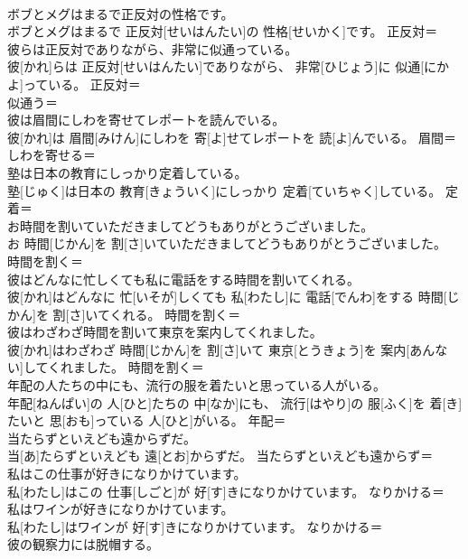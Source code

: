 \documentclass[8pt]{extreport}
\begin{document}
\begin{CJK}{UTF8}{min}
\\	ボブとメグはまるで正反対の性格です。	
\\	ボブとメグはまるで 正反対[せいはんたい]の 性格[せいかく]です。	正反対＝ 
\\	彼らは正反対でありながら、非常に似通っている。	
\\	彼[かれ]らは 正反対[せいはんたい]でありながら、 非常[ひじょう]に 似通[にかよ]っている。	正反対＝ 
\\	似通う＝ 
\\	彼は眉間にしわを寄せてレポートを読んでいる。	
\\	彼[かれ]は 眉間[みけん]にしわを 寄[よ]せてレポートを 読[よ]んでいる。	眉間＝ 
\\	しわを寄せる＝ 
\\	塾は日本の教育にしっかり定着している。	
\\	塾[じゅく]は日本の 教育[きょういく]にしっかり 定着[ていちゃく]している。	定着＝ 
\\	お時間を割いていただきましてどうもありがとうございました。	
\\	お 時間[じかん]を 割[さ]いていただきましてどうもありがとうございました。	時間を割く＝ 
\\	彼はどんなに忙しくても私に電話をする時間を割いてくれる。	
\\	彼[かれ]はどんなに 忙[いそが]しくても 私[わたし]に 電話[でんわ]をする 時間[じかん]を 割[さ]いてくれる。	時間を割く＝ 
\\	彼はわざわざ時間を割いて東京を案内してくれました。	
\\	彼[かれ]はわざわざ 時間[じかん]を 割[さ]いて 東京[とうきょう]を 案内[あんない]してくれました。	時間を割く＝ 
\\	年配の人たちの中にも、流行の服を着たいと思っている人がいる。	
\\	年配[ねんぱい]の 人[ひと]たちの 中[なか]にも、 流行[はやり]の 服[ふく]を 着[き]たいと 思[おも]っている 人[ひと]がいる。	年配＝ 
\\	当たらずといえども遠からずだ。	
\\	当[あ]たらずといえども 遠[とお]からずだ。	当たらずといえども遠からず＝ 
\\	私はこの仕事が好きになりかけています。	
\\	私[わたし]はこの 仕事[しごと]が 好[す]きになりかけています。	なりかける＝ 
\\	私はワインが好きになりかけています。	
\\	私[わたし]はワインが 好[す]きになりかけています。	なりかける＝ 
\\	彼の観察力には脱帽する。	

\end{CJK}
\end{document}
